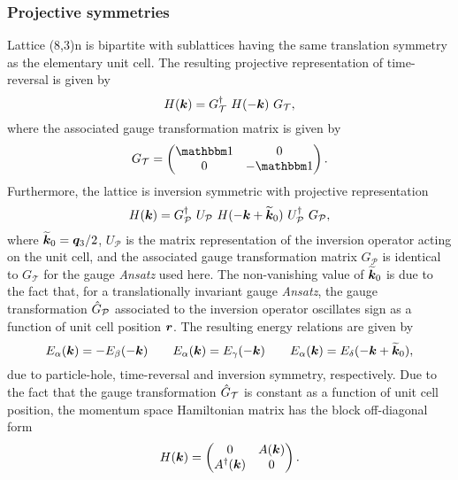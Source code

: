 \subsubsection{Projective symmetries}
%
%
Lattice (8,3)n is bipartite with sublattices having the same translation symmetry as the elementary unit cell.
The resulting projective representation of time-reversal is given by
%
\begin{equation}
	H(\bm{k}) = G^{\dagger}_{\mathcal{T}}~H(-\bm{k})~G_{\mathcal{T}},
\end{equation}
%
where the associated gauge transformation matrix is given by
%
\begin{equation}
	G_{\mathcal{T}} =
		\begin{pmatrix}
			\id & 0 \\
			0	& -\id
		\end{pmatrix}.
\end{equation}
%
Furthermore, the lattice is inversion symmetric with projective representation
%
\begin{equation}
	H(\bm{k}) = G^{\dagger}_{\mathcal{P}}~U_{\mathcal{P}}~H(-\bm{k} + \widetilde{\bm{k}}_0)~U^{\dagger}_{\mathcal{P}}~G_{\mathcal{P}},
\end{equation}
%
where $\widetilde{\bm{k}}_0 = \bm{q}_3/2$, $U_{\mathcal{P}}$ is the matrix representation of the inversion operator acting on the unit cell, and the associated gauge transformation matrix $G_{\mathcal{P}}$ is identical to $G_{\mathcal{T}}$  for the gauge \textit{Ansatz} used here.
The non-vanishing value of $\widetilde{\bm{k}}_0$ is due to the fact that, for a translationally invariant gauge \textit{Ansatz}, the gauge transformation $\hat{G}_{\mathcal{P}}$ associated to the inversion operator oscillates sign as a function of unit cell position $\bm{r}$.
The resulting energy relations are given by
%
\begin{equation}
	E_{\alpha}(\bm{k}) = -E_{\beta}(-\bm{k}) \qquad E_{\alpha}(\bm{k}) = E_{\gamma}(-\bm{k}) \qquad E_{\alpha}(\bm{k}) = E_{\delta}(-\bm{k} + \widetilde{\bm{k}}_0),
\end{equation}
%
due to particle-hole, time-reversal and inversion symmetry, respectively.
Due to the fact that the gauge transformation $\hat{G}_{\mathcal{T}}$ is constant as a function of unit cell position, the momentum space Hamiltonian matrix has the block off-diagonal form
%
\begin{equation}
	H(\bm{k}) =
		\begin{pmatrix}
			0			& A(\bm{k}) \\
			A^{\dagger}(\bm{k})	& 0
		\end{pmatrix}.
\end{equation}
%


